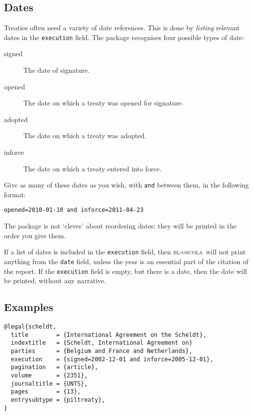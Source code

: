 \documentclass[a5paper,fontsize=9pt,DIV=1]{scrartcl}
\newcommand{\oscola}{\textsc{bl-oscola}}
\newcounter{egcounter}\setcounter{egcounter}{0}
\newenvironment{bibexample}[1][]{%
  \medskip\par\small\noindent\ignorespaces
  \marginpar{[\refstepcounter{egcounter}\arabic{egcounter}]\label{#1}}
  \begin{minipage}[t]{0.95\linewidth}}
 {\end{minipage}\par\medskip}
\begin{document}
\subsection{Dates}

Treaties often need a variety of date references. This is done by
\emph{listing} relevant dates in the \texttt{execution} field. The
package recognises four possible types of date: 
\begin{description}
\item[signed]
The date of signature.  
\item[opened] 
The date on which
a treaty was opened for signature.  
\item[adopted] 
The date on which a
treaty was adopted.  
\item[inforce]
The date on which a treaty entered
into force.  
\end{description} 
Give as many of these dates as you
wish, with \texttt{and} between them, in the following format:
\begin{center} \texttt{opened=2010-01-10 and inforce=2011-04-23}
\end{center}

The package is not `clever' about reordering dates: they will be
printed in the order you give them.

If a list of dates is included in the \texttt{execution} field, then
\oscola\ will not print anything from the \texttt{date} field, unless
the year is an essential part of the citation of the report. If the
\texttt{execution} field is empty, but there is a date, then the date
will be printed, without any narrative.

\subsection{Examples}

\begin{bibexample}[scheldt]
\begin{verbatim}
@legal{scheldt,
  title        = {International Agreement on the Scheldt},
  indextitle   = {Scheldt, International Agreement on}
  parties      = {Belgium and France and Netherlands},
  execution    = {signed=2002-12-01 and inforce=2005-12-01},
  pagination   = {article},
  volume       = {2351},
  journaltitle = {UNTS},
  pages        = {13},
  entrysubtype = {piltreaty},
}
\end{verbatim}
\end{bibexample}
\end{document}
